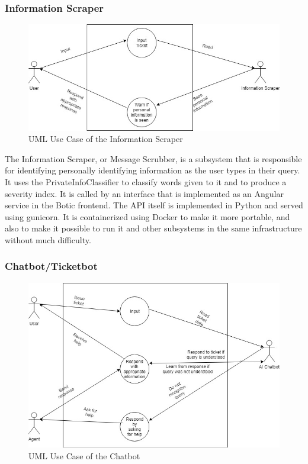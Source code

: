 \documentclass[11pt]{article}
\begin{document}
\subsubsection{Information Scraper}

\begin{figure}[H]
	\centering
	\includegraphics[width=1.0\textwidth]{../../images/Information_Scraper_UCD.jpg}
	\caption{UML Use Case of the Information Scraper}
\end{figure}

The Information Scraper, or Message Scrubber, is a subsystem that is responsible for identifying personally identifying information as the user types in their query. It uses the PrivateInfoClassifier to classify words given to it and to produce a severity index. It is called by an interface that is implemented as an Angular service in the Botic frontend. The API itself is implemented in Python and served using gunicorn. It is containerized using Docker to make it more portable, and also to make it possible to run it and other subsystems in the same infrastructure without much difficulty.

\subsubsection{Chatbot/Ticketbot}

\begin{figure}[H]
	\centering
	\includegraphics[width=1.0\textwidth]{../../images/AI_Chatbot_UCD.jpg}
	\caption{UML Use Case of the Chatbot}
\end{figure}
\end{document}
